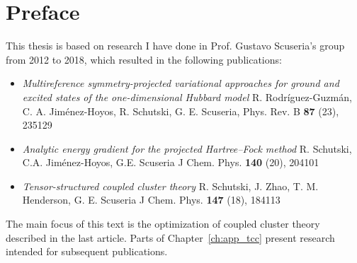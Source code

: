 \section*{Preface}

This thesis is based on research I have done in Prof. Gustavo Scuseria's group 
from 2012 to 2018, which resulted in the following publications:

\begin{itemize}
 \item \emph{Multireference symmetry-projected variational approaches for 
ground and excited states of the one-dimensional Hubbard model}
R. Rodríguez-Guzmán, C. A. Jiménez-Hoyos, R. Schutski, G. E. Scuseria,
Phys. Rev. B \textbf{87} (23), 235129
 \item \emph{Analytic energy gradient for the projected Hartree–Fock method}
R. Schutski, C.A. Jiménez-Hoyos, G.E. Scuseria
J Chem. Phys. \textbf{140} (20), 204101
 \item \emph{Tensor-structured coupled cluster theory}
R. Schutski, J. Zhao, T. M. Henderson, G. E. Scuseria
J Chem. Phys. \textbf{147} (18), 184113 
\end{itemize}

The main focus of this text is the optimization of coupled cluster theory 
described in the last article. Parts of Chapter~\ref{ch:app_tcc} present 
research intended for subsequent publications.